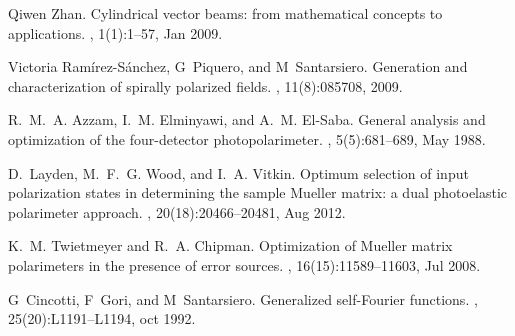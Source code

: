 \documentclass{article}
\begin{document}
\begin{thebibliography}{10}
	Qiwen Zhan.
	\newblock Cylindrical vector beams: from mathematical concepts to applications.
	, 1(1):1--57, Jan 2009.
	
	Victoria Ram\'{i}rez-S\'{a}nchez, G~Piquero, and M~Santarsiero.
	\newblock Generation and characterization of spirally polarized fields.
	, 11(8):085708,
	2009.
	
	R.~M.~A. Azzam, I.~M. Elminyawi, and A.~M. El-Saba.
	\newblock General analysis and optimization of the four-detector
	photopolarimeter.
	, 5(5):681--689, May 1988.
	
	D.~Layden, M.~F.~G. Wood, and I.~A. Vitkin.
	\newblock Optimum selection of input polarization states in determining the
	sample {Mueller} matrix: a dual photoelastic polarimeter approach.
	, 20(18):20466--20481, Aug 2012.
	
	K.~M. Twietmeyer and R.~A. Chipman.
	\newblock Optimization of {Mueller} matrix polarimeters in the presence of
	error sources.
	, 16(15):11589--11603, Jul 2008.
	
	G~Cincotti, F~Gori, and M~Santarsiero.
	\newblock Generalized {self-Fourier} functions.
	,
	25(20):L1191--L1194, oct 1992.
	
\end{thebibliography}


 
\end{document}

